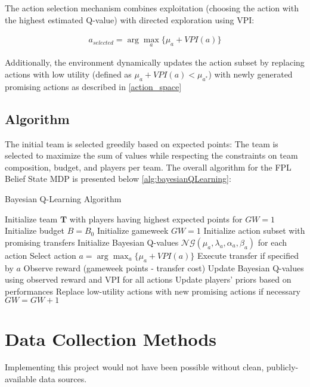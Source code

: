 The action selection mechanism combines exploitation (choosing the action with the highest estimated Q-value) with directed exploration using VPI:

\begin{align}
a_{selected} = \arg\max_a \{\mu_a + VPI(a)\}
\end{align}

Additionally, the environment dynamically updates the action subset by replacing actions with low utility (defined as $\mu_a + VPI(a) < \mu_{a^*}$) with newly generated promising actions as described in \ref{action_space}

\subsection{Algorithm}
The initial team is selected greedily based on expected points:
The team is selected to maximize the sum of values while respecting the constraints on team composition, budget, and players per team.
The overall algorithm for the FPL Belief State MDP is presented below \ref{alg:bayesianQLearning}:

\begin{algorithm}
\caption{Bayesian Q-Learning Algorithm}
\begin{algorithmic}[1]
\State Initialize team $\mathbf{T}$ with players having highest expected points for $GW = 1$
\State Initialize budget $B = B_0$
\State Initialize gameweek $GW = 1$
\State Initialize action subset with promising transfers
\State Initialize Bayesian Q-values $\mathcal{NG}(\mu_a, \lambda_a, \alpha_a, \beta_a)$ for each action
    \State Select action $a = \arg\max_a \{\mu_a + VPI(a)\}$ 
    \State Execute transfer if specified by $a$
    \State Observe reward (gameweek points - transfer cost)
    \State Update Bayesian Q-values using observed reward and VPI for all actions
    \State Update players' priors based on performances
    \State Replace low-utility actions with new promising actions if necessary
    \State $GW = GW + 1$
\EndWhile
\end{algorithmic}
\label{alg:bayesianQLearning}
\end{algorithm}

\section{Data Collection Methods}
Implementing this project would not have been possible without clean, publicly-available data sources. 


